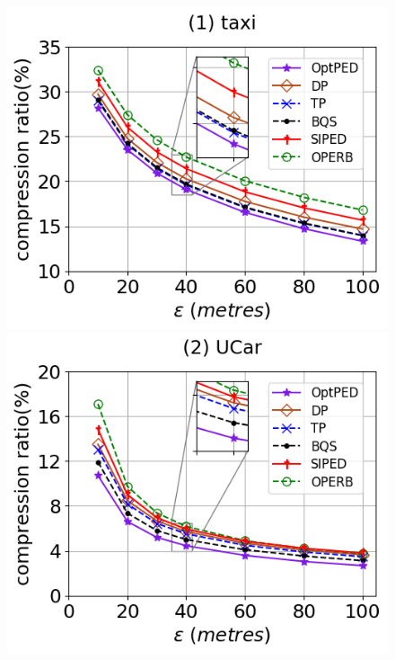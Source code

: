 \begin{figure}[tb!]
	\centering
	\includegraphics[scale=0.315]{Figures/Exp-PED-CR-epsilon-taxi.png}\hspace{1ex}
	\includegraphics[scale=0.315]{Figures/Exp-PED-CR-epsilon-service.png} 	\hspace{1ex}

\end{figure}
